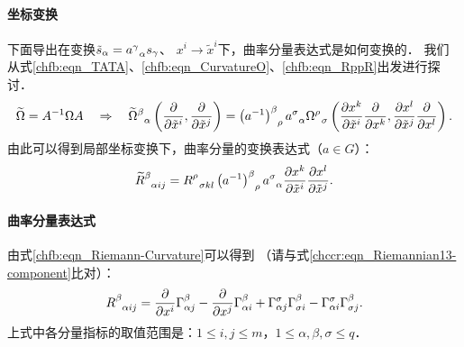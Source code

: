 \paragraph{坐标变换} 下面导出在变换$\tilde{s}_\alpha=a_{\hphantom{\alpha}\alpha}^\gamma s_\gamma$、
$x^i\to \tilde{x}^i$下，曲率分量表达式是如何变换的．
我们从式\eqref{chfb:eqn_TATA}、\eqref{chfb:eqn_CurvatureO}、\eqref{chfb:eqn_RppR}出发进行探讨．
\begin{align*}
	\widetilde{\Omega} =A^{-1} \Omega A \quad \Rightarrow \quad 
	\widetilde{\Omega}_{\hphantom{\alpha}\alpha}^\beta
	\left( \frac{\partial }{\partial \tilde{x}^i}, \frac{\partial }{\partial \tilde{x}^j} \right) 
	=\left(a^{-1}\right)_{\hphantom{\alpha}\rho}^\beta a_{\hphantom{\alpha}\alpha}^\sigma 
	\Omega_{\hphantom{\alpha}\sigma}^\rho
	\left( \frac{\partial x^k }{\partial \tilde{x}^i} \frac{\partial }{\partial x^k}, 
	\frac{\partial x^l }{\partial \tilde{x}^j} \frac{\partial }{\partial x^l} \right) .
\end{align*}
由此可以得到局部坐标变换下，曲率分量的变换表达式（$a\in G$）：
\begin{equation}\label{chfb:eqn_Rvb-trans}
	\widetilde{R}^\beta_{\hphantom{\alpha}\alpha ij}
	= R^\rho_{\hphantom{\alpha}\sigma kl} 
	\left(a^{-1}\right)_{\hphantom{\alpha}\rho}^\beta a_{\hphantom{\alpha}\alpha}^\sigma
	\frac{\partial x^k }{\partial \tilde{x}^i} \frac{\partial x^l }{\partial \tilde{x}^j} .
\end{equation}


\paragraph{曲率分量表达式} 由式\eqref{chfb:eqn_Riemann-Curvature}可以得到
（请与式\eqref{chccr:eqn_Riemannian13-component}比对）：
\begin{equation}\label{chfb:eqn_R-vector-bundle}
	R_{\hphantom{\alpha}\alpha i j}^\beta 
	= \frac{\partial}{\partial x^i} \Gamma_{\alpha j}^{\beta} 
	-\frac{\partial}{\partial x^j} \Gamma_{\alpha i}^{\beta}
	+\Gamma_{\alpha j}^{\sigma} \Gamma_{\sigma i}^{\beta} 
	-  \Gamma_{\alpha i}^{\sigma}\Gamma_{\sigma j}^{\beta} .   
\end{equation}
上式中各分量指标的取值范围是：$ 1\leqslant i,j \leqslant m $，$ 1\leqslant \alpha,\beta,\sigma \leqslant q$．



